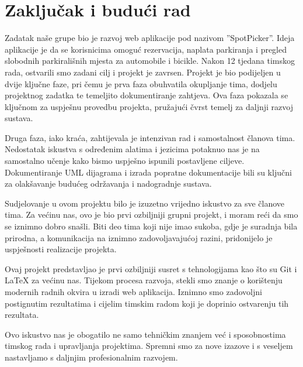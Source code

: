 \chapter{Zaključak i budući rad}
		
		
		
		 {Zadatak naše grupe bio je razvoj web aplikacije pod nazivom ”SpotPicker”. Ideja  aplikacije je da se korisnicima omoguć rezervacija, naplata parkiranja i pregled slobodnih parkirališnih mjesta za automobile i bicikle. Nakon 12 tjedana timskog rada, ostvarili smo zadani cilj i projekt je zavrsen. Projekt je bio podijeljen u dvije ključne faze, pri čemu je prva faza obuhvatila okupljanje tima, dodjelu projektnog zadatka te temeljito dokumentiranje zahtjeva. Ova faza pokazala se ključnom za uspješnu provedbu projekta, pružajući čvrst temelj za daljnji razvoj sustava.}
		 
		 {Druga faza, iako kraća, zahtijevala je intenzivan rad i samostalnost članova tima. Nedostatak iskustva s određenim alatima i jezicima potaknuo nas je na samostalno učenje kako bismo uspješno ispunili postavljene ciljeve. Dokumentiranje UML dijagrama i izrada popratne dokumentacije bili su ključni za olakšavanje budućeg održavanja i nadogradnje sustava.}
		 
		 {Sudjelovanje u ovom projektu bilo je izuzetno vrijedno iskustvo za sve članove tima. Za većinu nas, ovo je bio prvi ozbiljniji grupni projekt, i moram reći da smo se iznimno dobro snašli. Biti deo tima koji nije imao sukoba, gdje je suradnja bila prirodna, a komunikacija na iznimno zadovoljavajućoj razini, pridonijelo je uspješnosti realizacije projekta.}
		 
		 {Ovaj projekt predstavljao je prvi ozbiljniji susret s tehnologijama kao što su Git i LaTeX za većinu nas. Tijekom procesa razvoja, stekli smo znanje o korištenju modernih radnih okvira u izradi web aplikacija. Iznimno smo zadovoljni postignutim rezultatima i cijelim timskim radom koji je doprinio ostvarenju tih rezultata.}
		 
		 {Ovo iskustvo nas je obogatilo ne samo tehničkim znanjem već i sposobnostima timskog rada i upravljanja projektima. Spremni smo za nove izazove i s veseljem nastavljamo s daljnjim profesionalnim razvojem.}
		  
		 
		   
		   
		
		 
		
		\eject 